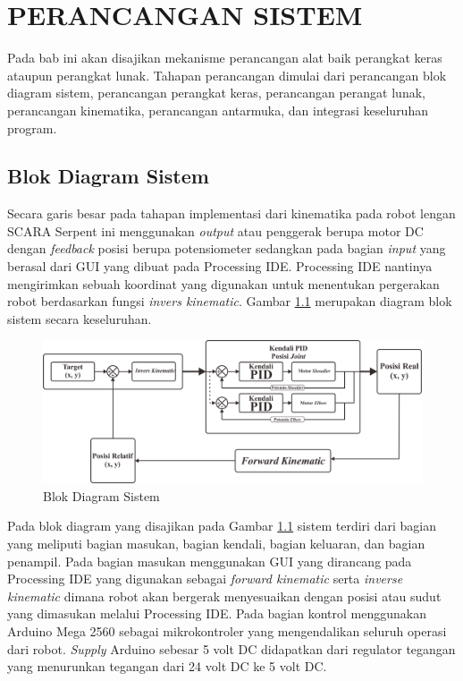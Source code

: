 
\chapter{PERANCANGAN SISTEM}
Pada bab ini akan disajikan mekanisme perancangan alat baik perangkat keras ataupun perangkat lunak. Tahapan perancangan dimulai dari perancangan blok diagram sistem, perancangan perangkat keras, perancangan perangat lunak, perancangan kinematika, perancangan antarmuka, dan integrasi keseluruhan program. 
\section{ Blok Diagram Sistem }
Secara garis besar pada tahapan implementasi dari kinematika pada robot lengan SCARA Serpent ini menggunakan \textit{output} atau penggerak berupa motor DC dengan \textit{feedback} posisi berupa potensiometer sedangkan pada bagian  \textit{input} yang berasal dari GUI yang dibuat pada Processing IDE. Processing IDE nantinya mengirimkan sebuah koordinat yang digunakan untuk menentukan pergerakan robot berdasarkan fungsi \textit{invers kinematic}. Gambar \ref{pic.diagram.bloksistem} merupakan diagram blok sistem secara keseluruhan.
\begin{figure}[H]
	\centering
	\includegraphics[width=13cm]{gambar/diagram_blok_new.png}
	\caption{Blok Diagram Sistem}
	\label{pic.diagram.bloksistem}
\end{figure}
Pada blok diagram yang disajikan pada Gambar \ref{pic.diagram.bloksistem} sistem terdiri dari bagian yang meliputi bagian masukan, bagian kendali, bagian keluaran, dan bagian penampil. Pada bagian masukan menggunakan GUI yang dirancang pada Processing IDE yang digunakan sebagai \textit{forward kinematic} serta \textit{inverse kinematic} dimana robot akan bergerak menyesuaikan dengan posisi atau sudut yang dimasukan melalui Processing IDE. 
Pada bagian kontrol menggunakan Arduino Mega 2560 sebagai mikrokontroler yang mengendalikan seluruh operasi dari robot. \textit{ Supply} Arduino sebesar 5 volt DC didapatkan dari regulator tegangan yang menurunkan tegangan dari 24 volt DC ke 5 volt DC. 

